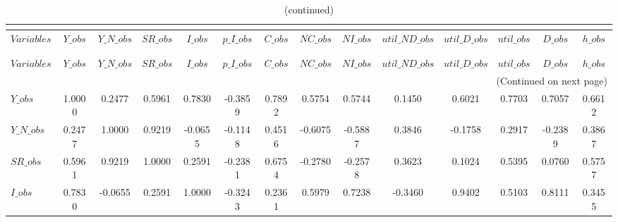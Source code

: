 
\begin{center}
\begin{longtable}{lccccccccccccc} 
\caption{MATRIX OF CORRELATIONS}\\
 \label{Table:th_corr_matrix}\\
\toprule 
$Variables      $	 & 	 $          Y\_obs$	 & 	 $      Y\_N\_obs$	 & 	 $         SR\_obs$	 & 	 $          I\_obs$	 & 	 $      p\_I\_obs$	 & 	 $          C\_obs$	 & 	 $         NC\_obs$	 & 	 $         NI\_obs$	 & 	 $  util\_ND\_obs$	 & 	 $   util\_D\_obs$	 & 	 $       util\_obs$	 & 	 $          D\_obs$	 & 	 $          h\_obs$\\
\midrule \endfirsthead 
\caption{(continued)}\\
 \toprule \\ 
$Variables      $	 & 	 $          Y\_obs$	 & 	 $      Y\_N\_obs$	 & 	 $         SR\_obs$	 & 	 $          I\_obs$	 & 	 $      p\_I\_obs$	 & 	 $          C\_obs$	 & 	 $         NC\_obs$	 & 	 $         NI\_obs$	 & 	 $  util\_ND\_obs$	 & 	 $   util\_D\_obs$	 & 	 $       util\_obs$	 & 	 $          D\_obs$	 & 	 $          h\_obs$\\
\midrule \endhead 
\midrule \multicolumn{14}{r}{(Continued on next page)} \\ \bottomrule \endfoot 
\bottomrule \endlastfoot 
$Y\_obs         $	 & 	           1.0000	 & 	           0.2477	 & 	           0.5961	 & 	           0.7830	 & 	          -0.3859	 & 	           0.7892	 & 	           0.5754	 & 	           0.5744	 & 	           0.1450	 & 	           0.6021	 & 	           0.7703	 & 	           0.7057	 & 	           0.6612 \\ 
$Y\_N\_obs      $	 & 	           0.2477	 & 	           1.0000	 & 	           0.9219	 & 	          -0.0655	 & 	          -0.1148	 & 	           0.4516	 & 	          -0.6075	 & 	          -0.5887	 & 	           0.3846	 & 	          -0.1758	 & 	           0.2917	 & 	          -0.2389	 & 	           0.3867 \\ 
$SR\_obs        $	 & 	           0.5961	 & 	           0.9219	 & 	           1.0000	 & 	           0.2591	 & 	          -0.2381	 & 	           0.6754	 & 	          -0.2780	 & 	          -0.2578	 & 	           0.3623	 & 	           0.1024	 & 	           0.5395	 & 	           0.0760	 & 	           0.5757 \\ 
$I\_obs         $	 & 	           0.7830	 & 	          -0.0655	 & 	           0.2591	 & 	           1.0000	 & 	          -0.3243	 & 	           0.2361	 & 	           0.5979	 & 	           0.7238	 & 	          -0.3460	 & 	           0.9402	 & 	           0.5103	 & 	           0.8111	 & 	           0.3455 \\ 

\end{longtable}
\end{center}
